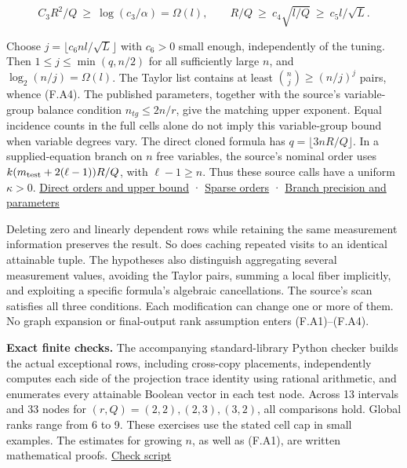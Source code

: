 \documentclass[
  11pt,
]{article}
\begin{document}
\[
   C_3 R^2/Q \ \ge\ \log(c_3/\alpha)=\Omega(l),
   \qquad R/Q\ \ge\ c_4 \sqrt{l/Q}\ \ge\ c_5 l/\sqrt L .
\]

Choose \(j=\lfloor c_6 n l/\sqrt L\rfloor\) with \(c_6>0\) small enough,
independently of the tuning. Then \(1\le j\le\min(q,n/2)\) for all
sufficiently large \(n\), and \(\log_2(n/j)=\Omega(l)\). The Taylor list
contains at least \(\binom{n}{j}\ge (n/j)^j\) pairs, whence (F.A4). The
published parameters, together with the source's variable-group
balance condition \(n_{tg}\le 2n/r\), give the matching upper
exponent. Equal incidence counts in the full cells alone do not
imply this variable-group bound when variable degrees vary.
The direct cloned
formula has \(q=\lfloor3nR/Q\rfloor\). In a supplied-equation branch on
\(n\) free variables, the source's nominal order uses
\(k(m_{\rm test}+2(\ell-1))R/Q\), with \(\ell-1\ge n\). Thus these
source calls have a uniform \(\kappa>0\).
\href{https://github.com/openai/math/blob/main/preprints/The-Exponential-Time-Hypothesis-is-False-October-25-2026/build/main_full_version.tex\#L965-L1017}{Direct
orders and upper bound} ·
\href{https://github.com/openai/math/blob/main/preprints/The-Exponential-Time-Hypothesis-is-False-October-25-2026/build/main_full_version.tex\#L3014-L3055}{Sparse
orders} ·
\href{https://github.com/openai/math/blob/main/preprints/The-Exponential-Time-Hypothesis-is-False-October-25-2026/build/main_full_version.tex\#L3142-L3196}{Branch
precision and parameters}

Deleting zero and linearly dependent rows while retaining the same
measurement information preserves the result. So does caching repeated
visits to an identical attainable tuple. The hypotheses also distinguish
aggregating several measurement values, avoiding the Taylor pairs,
summing a local fiber implicitly, and exploiting a specific formula's
algebraic cancellations. The source's scan satisfies all three
conditions. Each modification can change one or more of them. No graph
expansion or final-output rank assumption enters (F.A1)--(F.A4).

\textbf{Exact finite checks.} The accompanying standard-library Python
checker builds the actual exceptional rows, including cross-copy
placements, independently computes each side of the projection trace
identity using rational arithmetic, and enumerates every attainable
Boolean vector in each test node. Across 13 intervals and 33 nodes for
\((r,Q)=(2,2),(2,3),(3,2)\), all comparisons hold. Global ranks range
from 6 to 9. These exercises use the stated cell cap in small examples.
The estimates for growing \(n\), as well as (F.A1), are written
mathematical proofs. \href{https://github.com/dch-and-Elara/some-research-inspired-by-openais-eth-preprint/tree/main/rank-budget-barriers}{Check
script}
\end{document}
